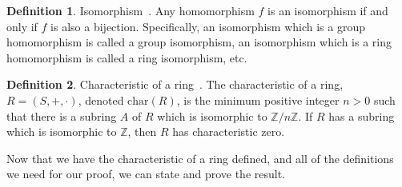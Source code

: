 \documentclass[11pt]{article}
\theoremstyle{definition}
\newtheorem{definition}{Definition}
\theoremstyle{plain}
\theoremstyle{remark}
\begin{document}
	\begin{definition}{Isomorphism~\cite{lang}.}
		Any homomorphism \(f\) is an isomorphism if and only if \(f\) is also a
		bijection. Specifically, an isomorphism which is a group homomorphism
		is called a group isomorphism, an isomorphism which is a ring
		homomorphism is called a ring isomorphism, etc.
	\end{definition}

	\begin{definition}{Characteristic of a ring~\cite{lang}.}
		The characteristic of a ring, \(R = (S, +, \cdot)\), denoted
		\(\mathrm{char}(R)\), is the minimum positive integer \(n > 0\) such
		that there is a subring \(A\) of \(R\) which is isomorphic to
		\(\mathbb{Z}/n\mathbb{Z}\). If \(R\) has a subring which is isomorphic
		to \(\mathbb{Z}\), then \(R\) has characteristic zero.
	\end{definition}

	Now that we have the characteristic of a ring defined, and all of the
	definitions we need for our proof, we can state and prove the result.
\end{document}
